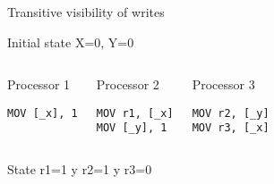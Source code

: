 \begin{frame}[t,fragile]{Transitive visibility of writes}

\begin{block}{Initial state}
X=0, Y=0
\end{block}


\begin{columns}[T]


\begin{block}{Processor 1}
\begin{lstlisting}[language={[x86masm]Assembler}]
MOV [_x], 1
\end{lstlisting}
\end{block}

\begin{block}{Processor 2}
\begin{lstlisting}[language={[x86masm]Assembler}]
MOV r1, [_x]
MOV [_y], 1
\end{lstlisting}
\end{block}

\begin{block}{Processor 3}
\begin{lstlisting}[language={[x86masm]Assembler}]
MOV r2, [_y]
MOV r3, [_x]
\end{lstlisting}
\end{block}

\end{columns}


\begin{block}{State }
r1=1 y r2=1 y r3=0
\end{block}

\end{frame}



